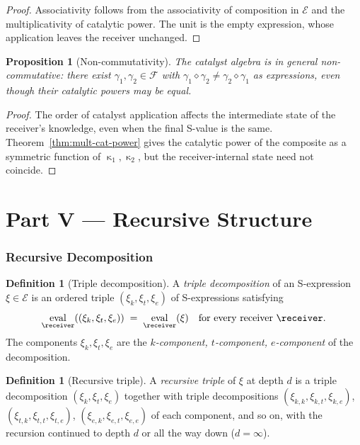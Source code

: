 \documentclass[11pt,a4paper]{article}
\theoremstyle{thmstyle}
\newtheorem{proposition}[theorem]{Proposition}
\theoremstyle{thmstyle}
\theoremstyle{definition}
\newtheorem{definition}[theorem]{Definition}
\theoremstyle{remark}
\DeclareMathOperator{\eval}{eval}
\DeclareMathOperator{\catpow}{\kappa}
\newcommand{\Expr}{\mathcal{E}}
\newcommand{\Frame}{\mathcal{F}}
\begin{document}
\begin{proof}
Associativity follows from the associativity of
composition in $\Expr$ and the multiplicativity of
catalytic power.  The unit is the empty expression,
whose application leaves the receiver unchanged.
\end{proof}

\begin{proposition}[Non-commutativity]\label{prop:non-comm}
The catalyst algebra is in general non-commutative:
there exist $\gamma_{1}, \gamma_{2} \in \Frame$ with
$\gamma_{1} \diamond \gamma_{2} \neq \gamma_{2}
\diamond \gamma_{1}$ as expressions, even though
their catalytic powers may be equal.
\end{proposition}

\begin{proof}
The order of catalyst application affects the
intermediate state of the receiver's knowledge, even
when the final S-value is the same.
Theorem~\ref{thm:mult-cat-power} gives the catalytic
power of the composite as a symmetric function of
$\catpow_{1}, \catpow_{2}$, but the receiver-internal
state need not coincide.
\end{proof}

\clearpage

\part*{Part V --- Recursive Structure}

\section{Recursive Decomposition}
\label{sec:recursive-decomposition}

\begin{definition}[Triple decomposition]\label{def:triple-decomp}
A \emph{triple decomposition} of an S-expression
$\xi \in \Expr$ is an ordered triple
$(\xi_{k}, \xi_{t}, \xi_{e})$ of S-expressions
satisfying
\[
\eval_{\receiver}((\xi_{k}, \xi_{t}, \xi_{e}))
\;=\; \eval_{\receiver}(\xi)
\quad \text{for every receiver } \receiver.
\]
The components $\xi_{k}, \xi_{t}, \xi_{e}$ are the
\emph{$k$-component, $t$-component, $e$-component} of
the decomposition.
\end{definition}

\begin{definition}[Recursive triple]\label{def:rec-triple}
A \emph{recursive triple} of $\xi$ at depth $d$ is a
triple decomposition $(\xi_{k}, \xi_{t}, \xi_{e})$
together with triple decompositions
$(\xi_{k,k}, \xi_{k,t}, \xi_{k,e})$,
$(\xi_{t,k}, \xi_{t,t}, \xi_{t,e})$,
$(\xi_{e,k}, \xi_{e,t}, \xi_{e,e})$ of each component,
and so on, with the recursion continued to depth $d$
or all the way down ($d = \infty$).
\end{definition}
\end{document}
